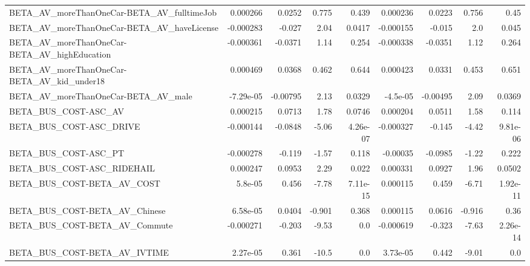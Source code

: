 \begin{tabular}{lrrrrrrrr}
BETA\_AV\_moreThanOneCar-BETA\_AV\_fulltimeJob         &    0.000266 &       0.0252 &     0.775 &    0.439 &   0.000236 &      0.0223 &        0.756 &          0.45 \\
BETA\_AV\_moreThanOneCar-BETA\_AV\_haveLicense         &   -0.000283 &       -0.027 &      2.04 &   0.0417 &  -0.000155 &      -0.015 &          2.0 &         0.045 \\
BETA\_AV\_moreThanOneCar-BETA\_AV\_highEducation       &   -0.000361 &      -0.0371 &      1.14 &    0.254 &  -0.000338 &     -0.0351 &         1.12 &         0.264 \\
BETA\_AV\_moreThanOneCar-BETA\_AV\_kid\_under18         &    0.000469 &       0.0368 &     0.462 &    0.644 &   0.000423 &      0.0331 &        0.453 &         0.651 \\
BETA\_AV\_moreThanOneCar-BETA\_AV\_male                &   -7.29e-05 &     -0.00795 &      2.13 &   0.0329 &   -4.5e-05 &    -0.00495 &         2.09 &        0.0369 \\
BETA\_BUS\_COST-ASC\_AV                               &    0.000215 &       0.0713 &      1.78 &   0.0746 &   0.000204 &      0.0511 &         1.58 &         0.114 \\
BETA\_BUS\_COST-ASC\_DRIVE                            &   -0.000144 &      -0.0848 &     -5.06 & 4.26e-07 &  -0.000327 &      -0.145 &        -4.42 &      9.81e-06 \\
BETA\_BUS\_COST-ASC\_PT                               &   -0.000278 &       -0.119 &     -1.57 &    0.118 &   -0.00035 &     -0.0985 &        -1.22 &         0.222 \\
BETA\_BUS\_COST-ASC\_RIDEHAIL                         &    0.000247 &       0.0953 &      2.29 &    0.022 &   0.000331 &      0.0927 &         1.96 &        0.0502 \\
BETA\_BUS\_COST-BETA\_AV\_COST                         &     5.8e-05 &        0.456 &     -7.78 & 7.11e-15 &   0.000115 &       0.459 &        -6.71 &      1.92e-11 \\
BETA\_BUS\_COST-BETA\_AV\_Chinese                      &    6.58e-05 &       0.0404 &    -0.901 &    0.368 &   0.000115 &      0.0616 &       -0.916 &          0.36 \\
BETA\_BUS\_COST-BETA\_AV\_Commute                      &   -0.000271 &       -0.203 &     -9.53 &      0.0 &  -0.000619 &      -0.323 &        -7.63 &      2.26e-14 \\
BETA\_BUS\_COST-BETA\_AV\_IVTIME                       &    2.27e-05 &        0.361 &     -10.5 &      0.0 &   3.73e-05 &       0.442 &        -9.01 &           0.0 \\

\end{tabular}
